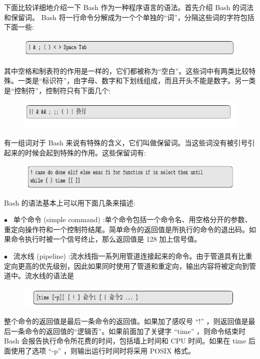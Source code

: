 \documentclass[12pt，a4paper]{article}
\numberwithin{equation}{section}
\begin{document}
下面比较详细地介绍一下 Bash 作为一种程序语言的语法。首先介绍 Bash 的词法和保留词。 Bash 将一行命令分解成为一个个单独的“词”，分隔这些词的字符包括下面一些:
\begin{figure}[H]
\centering
\includegraphics[scale=0.6]{./figures/245.png}
\end{figure}
其中空格和制表符的作用是一样的，它们都被称为“空白”。这些词中有两类比较特殊。一类是“标识符”，由字母、数字和下划线组成，而且开头不能是数字。另一类是“控制符”，控制符只有下面几个:
\begin{figure}[H]
\centering
\includegraphics[scale=0.6]{./figures/246.png}
\end{figure}
有一组词对于 Bash 来说有特殊的含义，它们叫做保留词。当这些词没有被引号引起来的时候会起到特殊的作用。这些保留词有:
\begin{figure}[H]
\centering
\includegraphics[scale=0.6]{./figures/247.png}
\end{figure}
Bash 的语法基本上可以用下面几条来描述:

$\bullet$~ 单个命令 (simple command) :单个命令包括一个命令名、用空格分开的参数、重定向操作符和一个控制符结尾。简单命令的返回值是所执行的命令的退出码。如果命令执行时被一个信号终止，那么返回值是 128 加上信号值。

$\bullet$~ 流水线 (pipeline) :流水线指一系列用管道连接起来的命令。由于管道具有比重定向更高的优先级别，因此如果同时使用了管道和重定向，输出内容将被定向到管道中。流水线的语法是
\begin{figure}[H]
\centering
\includegraphics[scale=0.6]{./figures/248.png}
\end{figure}
整个命令的返回值是最后一条命令的返回值。如果加了感叹号
“!” ，则返回值是最后一条命令的返回值的“逻辑否”。如果前面加了关键字 “time” ，则命令结束时 Bash 会报告执行命令所花费的时间，包括墙上时间和 CPU 时间。如果在 time 后面使用了选项 “-p” ，则输出运行时间时将采用 POSIX 格式。
\end{document}
